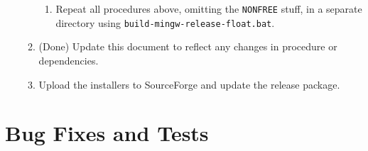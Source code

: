 \documentclass[11pt,letterpaper,onecolumn]{scrartcl}
\begin{document}
\begin{sloppypar}
\begin{enumerate}
\begin{enumerate}
				\begin{enumerate}
					\item Repeat all procedures above, omitting the \verb|NONFREE| stuff, in a separate directory using \texttt{build-mingw-release-float.bat}. 
				\end{enumerate}
	    \item (Done) Update this document to reflect any changes in procedure or dependencies. 
	    \item Upload the installers to SourceForge and update the release package.
		\end{enumerate}
 \end{enumerate}

\section{Bug Fixes and Tests}
\label{sec:BugFixesAndTests}


\end{sloppypar}
\end{document}
